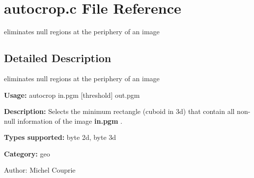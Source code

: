 \section{autocrop.c File Reference}
\label{autocrop_8c}
eliminates null regions at the periphery of an image  




\label{_details}
\subsection{Detailed Description}
eliminates null regions at the periphery of an image 

{\bf Usage:} autocrop in.pgm [threshold] out.pgm

{\bf Description:} Selects the minimum rectangle (cuboid in 3d) that contain all non-null information of the image {\bf in.pgm} .

{\bf Types supported:} byte 2d, byte 3d

{\bf Category:} geo

\begin{Desc}
\item[Author:]Michel Couprie \end{Desc}
